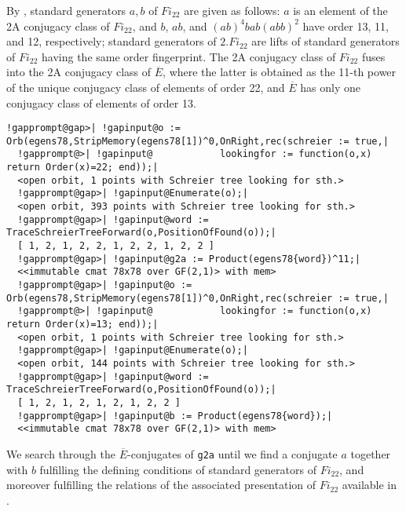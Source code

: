 \documentclass[a4paper,11pt]{report}
\begin{document}
{{ By \cite{AGR}, standard generators $a,b$ of $Fi_{{22}}$ are given as follows: $a$ is an element of the 2A conjugacy class of $Fi_{{22}}$, and $b$, $ab$, and $(ab)^4bab(abb)^2$ have order 13, 11, and 12, respectively; standard generators of $2.Fi_{{22}}$ are lifts of standard generators of $Fi_{{22}}$ having the same order fingerprint. The 2A conjugacy class of $Fi_{{22}}$ fuses into the 2A conjugacy class of $\overline{E}$, where the latter is obtained as the 11-th power of the unique conjugacy
class of elements of order 22, and $\overline{E}$ has only one conjugacy class of elements of order 13. 
\begin{Verbatim}[commandchars=!@|,fontsize=\small,frame=single,label=Example]
  !gapprompt@gap>| !gapinput@o := Orb(egens78,StripMemory(egens78[1])^0,OnRight,rec(schreier := true,|
  !gapprompt@>| !gapinput@            lookingfor := function(o,x) return Order(x)=22; end));|
  <open orbit, 1 points with Schreier tree looking for sth.>
  !gapprompt@gap>| !gapinput@Enumerate(o);|
  <open orbit, 393 points with Schreier tree looking for sth.>
  !gapprompt@gap>| !gapinput@word := TraceSchreierTreeForward(o,PositionOfFound(o));|
  [ 1, 2, 1, 2, 2, 1, 2, 2, 1, 2, 2 ]
  !gapprompt@gap>| !gapinput@g2a := Product(egens78{word})^11;|
  <<immutable cmat 78x78 over GF(2,1)> with mem>
  !gapprompt@gap>| !gapinput@o := Orb(egens78,StripMemory(egens78[1])^0,OnRight,rec(schreier := true,|
  !gapprompt@>| !gapinput@            lookingfor := function(o,x) return Order(x)=13; end));|
  <open orbit, 1 points with Schreier tree looking for sth.>
  !gapprompt@gap>| !gapinput@Enumerate(o);|
  <open orbit, 144 points with Schreier tree looking for sth.>
  !gapprompt@gap>| !gapinput@word := TraceSchreierTreeForward(o,PositionOfFound(o));|
  [ 1, 2, 1, 2, 1, 2, 1, 2, 2 ]
  !gapprompt@gap>| !gapinput@b := Product(egens78{word});|
  <<immutable cmat 78x78 over GF(2,1)> with mem> 
\end{Verbatim}
 

 We search through the $\overline{E}$-conjugates of \texttt{g2a} until we find a conjugate $a$ together with $b$ fulfilling the defining conditions of standard generators of $Fi_{{22}}$, and moreover fulfilling the relations of the associated presentation of $Fi_{{22}}$ available in \cite{AGR}. 

}}
\end{document}
